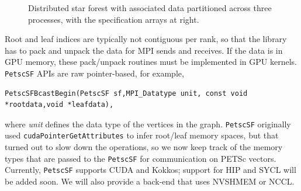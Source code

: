 \documentclass[5p,times]{elsarticle}
\begin{document}
\begin{figure}
{
  }
  \caption{Distributed star forest with associated data partitioned across three processes, with the specification arrays at right.
}
\label{fig:starpart}
\end{figure}

Root and leaf indices are typically not contiguous per rank, so that the library has to
pack and unpack the data for MPI sends and receives. If the data is in GPU memory, these
pack/unpack routines must be implemented in GPU kernels. {\tt PetscSF} APIs are raw pointer-based, for example, 
\begin{lstlisting}
PetscSFBcastBegin(PetscSF sf,MPI_Datatype unit, const void *rootdata,void *leafdata),
\end{lstlisting}
where \textit{unit} defines the data type of the
vertices in the graph. \texttt{PetscSF} originally used \texttt{cudaPointerGetAttributes}
to infer root/leaf memory spaces, but that turned out to slow down the operations, so we now keep track of the memory types that are passed to the
{\tt PetscSF} for communication on PETSc vectors. Currently, {\tt PetscSF} supports CUDA and Kokkos; support for HIP and
SYCL will be added soon. We will also provide a back-end that uses NVSHMEM or NCCL.
\end{document}
